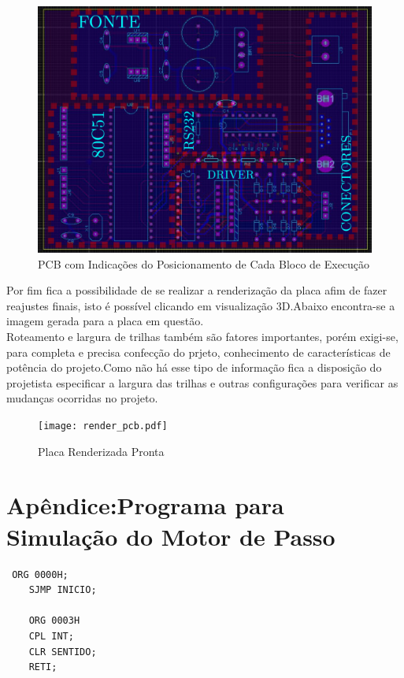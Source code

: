 \documentclass{Fabiano_file}
\begin{document}
{\begin{figure}[h!]
\centering
\includegraphics[width=1\textwidth]{projeto_pcb_com_rotulos.pdf}
\caption{PCB com Indicações do Posicionamento de Cada Bloco de Execução}
\label{fig:lista_de_materiais}
\end{figure}

\newpage

Por fim fica a possibilidade de se realizar a renderização da placa afim de fazer reajustes finais, isto é possível clicando em visualização 3D.Abaixo encontra-se
a imagem gerada para a placa em questão.\\
Roteamento e largura de trilhas também são fatores importantes, porém exigi-se, para completa e precisa confecção do prjeto, conhecimento de características de 
potência do projeto.Como não há esse tipo de informação fica a disposição do projetista especificar a largura das trilhas e outras configurações para verificar
as mudanças ocorridas no projeto.

\begin{figure}[h!]
\centering
\texttt{[image: render\_pcb.pdf]}
\caption{Placa Renderizada Pronta}
\label{fig:render_pcb}
\end{figure}

\newpage

\section{Apêndice:Programa para Simulação do Motor de Passo}
\begin{lstlisting}
 ORG 0000H;
	SJMP INICIO;

	ORG 0003H
	CPL INT;
	CLR SENTIDO;
	RETI;


\end{lstlisting}}
\end{document}
